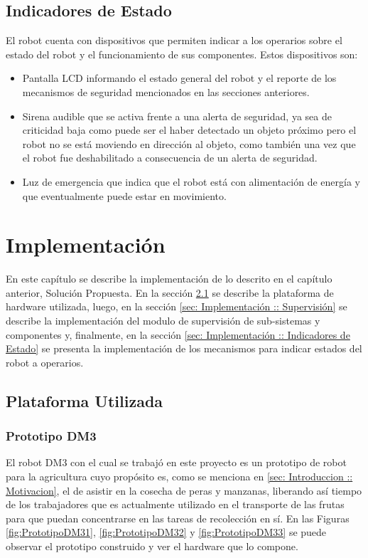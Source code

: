 \documentclass[withindex,glossary]{cam-thesis}
\begin{document}
\section{Indicadores de Estado} \label{sec: sol prop - Indicadores de Estado}
El robot cuenta con dispositivos que permiten indicar a los operarios sobre el estado del robot y el funcionamiento de sus componentes. Estos dispositivos son:
\begin{itemize}
\item Pantalla LCD informando el estado general del robot y el reporte de los mecanismos de seguridad mencionados en las secciones anteriores.
\item Sirena audible que se activa frente a una alerta de seguridad, ya sea de criticidad baja como puede ser el haber detectado un objeto próximo pero el robot no se está moviendo en dirección al objeto, como también una vez que el robot fue deshabilitado a consecuencia de un alerta de seguridad.
\item Luz de emergencia que indica que el robot está con alimentación de energía y que eventualmente puede estar en movimiento.
\end{itemize}

\chapter{Implementación}
En este capítulo se describe la implementación de lo descrito en el capítulo anterior, Solución Propuesta. En la sección \ref{sec: Implementación :: Plataforma Utilizada} se describe la plataforma de hardware utilizada, luego, en la sección \ref{sec: Implementación :: Supervisión} se describe la implementación del modulo de supervisión de sub-sistemas y componentes y, finalmente, en la sección \ref{sec: Implementación :: Indicadores de Estado} se presenta la implementación de los mecanismos para indicar estados del robot a operarios.

\section{Plataforma Utilizada} \label{sec: Implementación :: Plataforma Utilizada}
\subsection{Prototipo DM3}
El robot DM3 con el cual se trabajó en este proyecto es un prototipo de robot para la agricultura cuyo propósito es, como se menciona en \ref{sec: Introduccion :: Motivacion}, el de asistir en la cosecha de peras y manzanas, liberando así tiempo de los trabajadores que es actualmente utilizado en el transporte de las frutas para que puedan concentrarse en las tareas de recolección en sí. En las Figuras \ref{fig:PrototipoDM31}, \ref{fig:PrototipoDM32} y \ref{fig:PrototipoDM33} se puede observar el prototipo construido y ver el hardware que lo compone.
\end{document}
